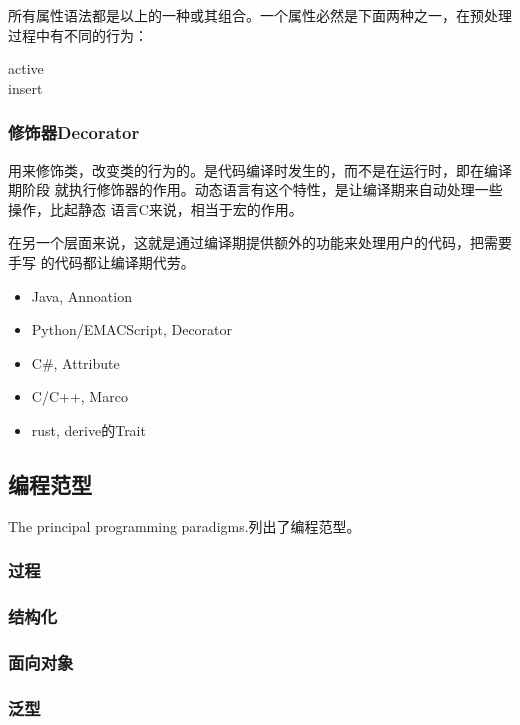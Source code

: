 所有属性语法都是以上的一种或其组合。一个属性必然是下面两种之一，在预处理过程中有不同的行为：

\begin{description}
    \item [active] 
    \item [insert] 
\end{description}

\subsubsection{修饰器Decorator}
用来修饰类，改变类的行为的。是代码编译时发生的，而不是在运行时，即在编译期阶段
就执行修饰器的作用。动态语言有这个特性，是让编译期来自动处理一些操作，比起静态
语言C来说，相当于宏的作用。

在另一个层面来说，这就是通过编译期提供额外的功能来处理用户的代码，把需要手写
的代码都让编译期代劳。
\begin{itemize}
    \item {Java, Annoation}
    \item {Python/EMACScript, Decorator}
    \item {C\#, Attribute}
    \item {C/C++, Marco}
    \item {rust, derive的Trait}
\end{itemize}


\subsection{编程范型}
The principal programming paradigms.\cite{TPPP}列出了编程范型。

\subsubsection{过程}

\subsubsection{结构化}

\subsubsection{面向对象}

\subsubsection{泛型}

